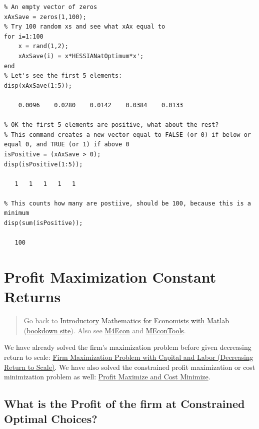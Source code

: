 \documentclass[
]{book}
\begin{document}
\begin{verbatim}
% An empty vector of zeros
xAxSave = zeros(1,100);
% Try 100 random xs and see what xAx equal to    
for i=1:100
    x = rand(1,2);
    xAxSave(i) = x*HESSIANatOptimum*x';
end
% Let's see the first 5 elements:
disp(xAxSave(1:5));

    0.0096    0.0280    0.0142    0.0384    0.0133

% OK the first 5 elements are positive, what about the rest?
% This command creates a new vector equal to FALSE (or 0) if below or equal 0, and TRUE (or 1) if above 0
isPositive = (xAxSave > 0);
disp(isPositive(1:5));

   1   1   1   1   1

% This counts how many are postiive, should be 100, because this is a minimum
disp(sum(isPositive));

   100
\end{verbatim}

\vspace{1em}

\hypertarget{profit-maximization-constant-returns}{%
\section{Profit Maximization Constant Returns}\label{profit-maximization-constant-returns}}

\begin{quote}
Go back to \href{https://math4econ.github.io/}{Introductory Mathematics for Economists with Matlab} (\href{https://math4econ.github.io/bookdown}{bookdown site}). Also see \href{http://fanwangecon.github.io/M4Econ}{M4Econ} and \href{https://fanwangecon.github.io/MEconTools/}{MEconTools}.
\end{quote}

We have already solved the firm's maximization problem before given
decreasing return to scale: \href{https://math4econ.github.io/matrix_application/KL_borrowhire_firm.html}{Firm Maximization Problem with Capital and
Labor (Decreasing Return to
Scale)}.
We have also solved the constrained profit maximization or cost
minimization problem as well: \href{https://math4econ.github.io/opti_firm_constrained/profit_maximize.html}{Profit Maximize and Cost
Minimize}.

\hypertarget{what-is-the-profit-of-the-firm-at-constrained-optimal-choices}{%
\subsection{What is the Profit of the firm at Constrained Optimal Choices?}\label{what-is-the-profit-of-the-firm-at-constrained-optimal-choices}}
\end{document}
